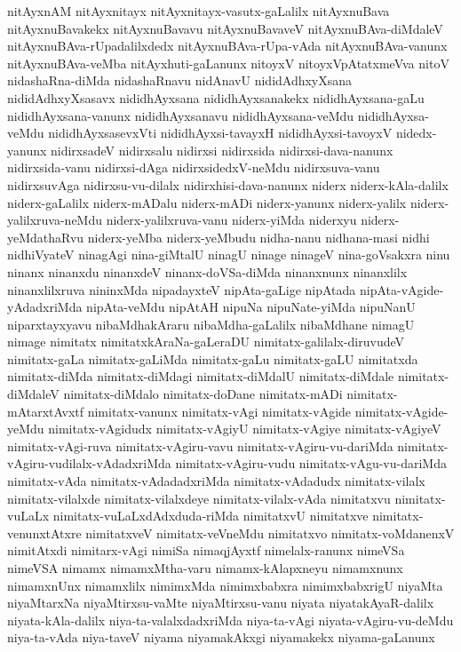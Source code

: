 {nitAyxnAM
nitAyxnitayx
nitAyxnitayx-vasutx-gaLalilx
nitAyxnuBava
nitAyxnuBavakekx
nitAyxnuBavavu
nitAyxnuBavaveV
nitAyxnuBAva-diMdaleV
nitAyxnuBAva-rUpadalilxdedx
nitAyxnuBAva-rUpa-vAda
nitAyxnuBAva-vanunx
nitAyxnuBAva-veMba
nitAyxhuti-gaLanunx
nitoyxV
nitoyxVpAtatxmeVva
nitoV
nidashaRna-diMda
nidashaRnavu
nidAnavU
nididAdhxyXsana
nididAdhxyXsasavx
nididhAyxsana
nididhAyxsanakekx
nididhAyxsana-gaLu
nididhAyxsana-vanunx
nididhAyxsanavu
nididhAyxsana-veMdu
nididhAyxsa-veMdu
nididhAyxsasevxVti
nididhAyxsi-tavayxH
nididhAyxsi-tavoyxV
nidedx-yanunx
nidirxsadeV
nidirxsalu
nidirxsi
nidirxsida
nidirxsi-dava-nanunx
nidirxsida-vanu
nidirxsi-dAga
nidirxsidedxV-neMdu
nidirxsuva-vanu
nidirxsuvAga
nidirxsu-vu-dilalx
nidirxhisi-dava-nanunx
niderx
niderx-kAla-dalilx
niderx-gaLalilx
niderx-mADalu
niderx-mADi
niderx-yanunx
niderx-yalilx
niderx-yalilxruva-neMdu
niderx-yalilxruva-vanu
niderx-yiMda
niderxyu
niderx-yeMdathaRvu
niderx-yeMba
niderx-yeMbudu
nidha-nanu
nidhana-masi
nidhi
nidhiVyateV
ninagAgi
nina-giMtalU
ninagU
ninage
ninageV
nina-goVsakxra
ninu
ninanx
ninanxdu
ninanxdeV
ninanx-doVSa-diMda
ninanxnunx
ninanxlilx
ninanxlilxruva
nininxMda
nipadayxteV
nipAta-gaLige
nipAtada
nipAta-vAgide-yAdadxriMda
nipAta-veMdu
nipAtAH
nipuNa
nipuNate-yiMda
nipuNanU
niparxtayxyavu
nibaMdhakAraru
nibaMdha-gaLalilx
nibaMdhane
nimagU
nimage
nimitatx
nimitatxkAraNa-gaLeraDU
nimitatx-galilalx-diruvudeV
nimitatx-gaLa
nimitatx-gaLiMda
nimitatx-gaLu
nimitatx-gaLU
nimitatxda
nimitatx-diMda
nimitatx-diMdagi
nimitatx-diMdalU
nimitatx-diMdale
nimitatx-diMdaleV
nimitatx-diMdalo
nimitatx-doDane
nimitatx-mADi
nimitatx-mAtarxtAvxtf
nimitatx-vanunx
nimitatx-vAgi
nimitatx-vAgide
nimitatx-vAgide-yeMdu
nimitatx-vAgidudx
nimitatx-vAgiyU
nimitatx-vAgiye
nimitatx-vAgiyeV
nimitatx-vAgi-ruva
nimitatx-vAgiru-vavu
nimitatx-vAgiru-vu-dariMda
nimitatx-vAgiru-vudilalx-vAdadxriMda
nimitatx-vAgiru-vudu
nimitatx-vAgu-vu-dariMda
nimitatx-vAda
nimitatx-vAdadadxriMda
nimitatx-vAdadudx
nimitatx-vilalx
nimitatx-vilalxde
nimitatx-vilalxdeye
nimitatx-vilalx-vAda
nimitatxvu
nimitatx-vuLaLx
nimitatx-vuLaLxdAdxduda-riMda
nimitatxvU
nimitatxve
nimitatx-venunxtAtxre
nimitatxveV
nimitatx-veVneMdu
nimitatxvo
nimitatx-voMdanenxV
nimitAtxdi
nimitarx-vAgi
nimiSa
nimaqjAyxtf
nimelalx-ranunx
nimeVSa
nimeVSA
nimamx
nimamxMtha-varu
nimamx-kAlapxneyu
nimamxnunx
nimamxnUnx
nimamxlilx
nimimxMda
nimimxbabxra
nimimxbabxrigU
niyaMta
niyaMtarxNa
niyaMtirxsu-vaMte
niyaMtirxsu-vanu
niyata
niyatakAyaR-dalilx
niyata-kAla-dalilx
niya-ta-valalxdadxriMda
niya-ta-vAgi
niyata-vAgiru-vu-deMdu
niya-ta-vAda
niya-taveV
niyama
niyamakAkxgi
niyamakekx
niyama-gaLanunx
}
